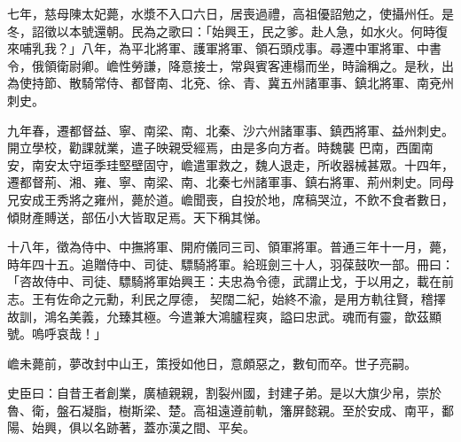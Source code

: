 \begin{pinyinscope}
 七年，慈母陳太妃薨，水漿不入口六日，居喪過禮，高祖優詔勉之，使攝州任。是冬，詔徵以本號還朝。民為之歌曰：「始興王，民之爹。赴人急，如水火。何時復來哺乳我？」八年，為平北將軍、護軍將軍、領石頭戍事。尋遷中軍將軍、中書令，俄領衛尉卿。嶦性勞謙，降意接士，常與賓客連榻而坐，時論稱之。是秋，出為使持節、散騎常侍、都督南、北兗、徐、青、冀五州諸軍事、鎮北將軍、南兗州刺史。



 九年春，遷都督益、寧、南梁、南、北秦、沙六州諸軍事、鎮西將軍、益州刺史。開立學校，勸課就業，遣子映親受經焉，由是多向方者。時魏襲
 巴南，西圍南安，南安太守垣季珪堅壁固守，嶦遣軍救之，魏人退走，所收器械甚眾。十四年，遷都督荊、湘、雍、寧、南梁、南、北秦七州諸軍事、鎮右將軍、荊州刺史。同母兄安成王秀將之雍州，薨於道。嶦聞喪，自投於地，席稿哭泣，不飲不食者數日，傾財產賻送，部伍小大皆取足焉。天下稱其悌。



 十八年，徵為侍中、中撫將軍、開府儀同三司、領軍將軍。普通三年十一月，薨，時年四十五。追贈侍中、司徒、驃騎將軍。給班劍三十人，羽葆鼓吹一部。冊曰：「咨故侍中、司徒、驃騎將軍始興王：夫忠為令德，武謂止戈，于以用之，載在前志。王有佐命之元勳，利民之厚德，
 契闊二紀，始終不渝，是用方軌往賢，稽擇故訓，鴻名美義，允臻其極。今遣兼大鴻臚程爽，謚曰忠武。魂而有靈，歆茲顯號。嗚呼哀哉！」



 嶦未薨前，夢改封中山王，策授如他日，意頗惡之，數旬而卒。世子亮嗣。



 史臣曰：自昔王者創業，廣植親親，割裂州國，封建子弟。是以大旗少帛，崇於魯、衛，盤石凝脂，樹斯梁、楚。高祖遠遵前軌，籓屏懿親。至於安成、南平，鄱陽、始興，俱以名跡著，蓋亦漢之間、平矣。



\end{pinyinscope}